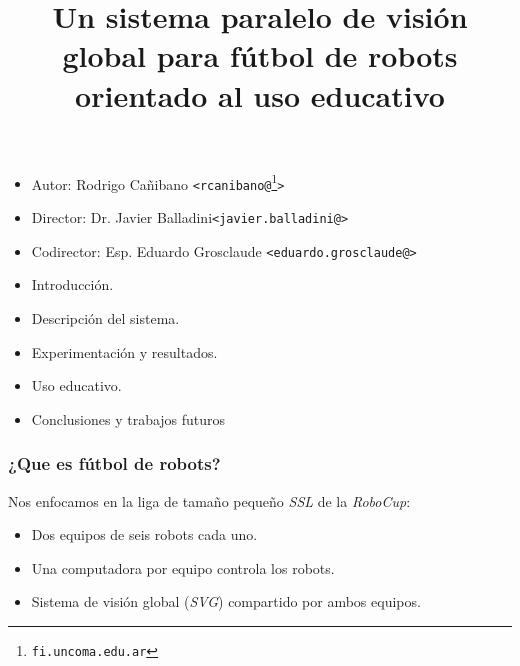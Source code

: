 \documentclass[11pt,a4paper,spanish]{beamer}
\title{Un sistema paralelo de visión global para fútbol de robots
	orientado al uso educativo}
\author{}
\date{}
\begin{document}
\begin{frame}

	\maketitle

\begin{itemize}

	\small

	\item Autor: Rodrigo Cañibano \texttt{<rcanibano@\footnote[1]{fi.uncoma.edu.ar}>}

	\item Director: Dr. Javier Balladini\texttt{<javier.balladini@\footnotemark[1]>}

	\item Codirector: Esp. Eduardo Grosclaude \texttt{<eduardo.grosclaude@\footnotemark[1]>}

\end{itemize}

\end{frame}

\begin{frame}

\begin{itemize}

\item Introducción.

\item Descripción del sistema.

\item Experimentación y resultados.

\item Uso educativo.

\item Conclusiones y trabajos futuros

\end{itemize}

\end{frame}

\begin{frame}

\frametitle{¿Que es fútbol de robots?}

	Nos enfocamos en la liga de tamaño pequeño \emph{SSL} de la
	\emph{RoboCup}:

\begin{itemize}

	\item Dos equipos de seis robots cada uno.

	\item Una computadora por equipo controla los robots.

	\item Sistema de visión global (\emph{SVG}) compartido por ambos
		equipos.

\end{itemize}

\end{frame}
\end{document}
